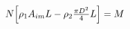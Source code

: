 \documentclass[preview]{standalone}
\begin{document}
\begin{align*}
N \Bigl[ \rho_1 A_{im} L - \rho_2 \tfrac{\pi D^2}{4} L \Bigr] = M
\end{align*}
\end{document}
